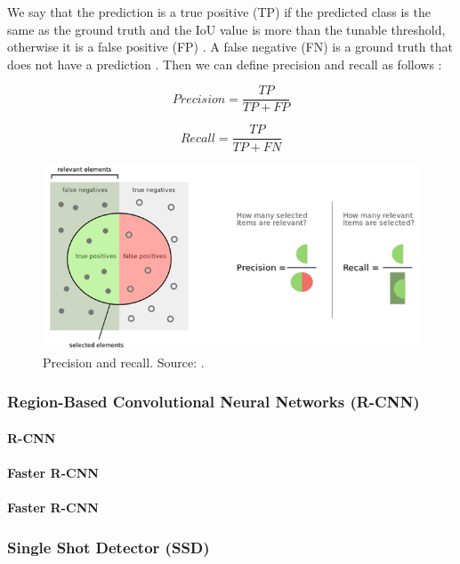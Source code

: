 \documentclass[a4paper,11pt,oneside]{article}
\begin{document}
  We say that the prediction is a true positive (TP) if the predicted class is the same as the ground truth and the IoU
  value is more than the tunable threshold, otherwise it is a false positive (FP)
  \cite{liu2020deep, elgendy2020deep, planche2019hands}. A false negative (FN) is a ground truth that does not have a
  prediction \cite{planche2019hands}. Then we can define precision and recall as follows
  \cite{burkov2019hundred, davis2006relationship}:

  $$Precision = \frac{TP}{TP + FP}$$

  $$Recall = \frac{TP}{TP + FN}$$

  \begin{figure}[ht]
    \begin{center}
      \includegraphics[width=\textwidth]{precision_recall.png}
    \end{center}
    \caption{Precision and recall. Source: \cite{precisionrecall}.}
  \end{figure}

  \subsubsection{Region-Based Convolutional Neural Networks (R-CNN)}

  \paragraph{R-CNN}
  \paragraph{Faster R-CNN}
  \paragraph{Faster R-CNN}

  \subsubsection{Single Shot Detector (SSD)}
\end{document}
